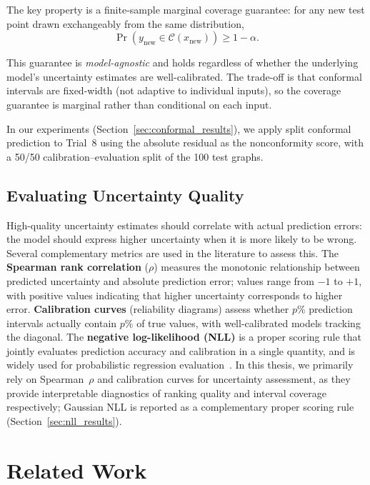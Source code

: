 The key property is a finite-sample marginal coverage guarantee: for any new test point drawn exchangeably from the same distribution,
\begin{equation}
    \Pr\!\left(y_\text{new} \in \mathcal{C}(x_\text{new})\right) \geq 1 - \alpha.
\end{equation}

This guarantee is \emph{model-agnostic} and holds regardless of whether the underlying model's uncertainty estimates are well-calibrated. The trade-off is that conformal intervals are fixed-width (not adaptive to individual inputs), so the coverage guarantee is marginal rather than conditional on each input.

In our experiments (Section~\ref{sec:conformal_results}), we apply split conformal prediction to Trial~8 using the absolute residual as the nonconformity score, with a 50/50 calibration--evaluation split of the 100 test graphs.

\subsection{Evaluating Uncertainty Quality}

High-quality uncertainty estimates should correlate with actual prediction errors: the model should express higher uncertainty when it is more likely to be wrong. Several complementary metrics are used in the literature to assess this. The \textbf{Spearman rank correlation} ($\rho$) measures the monotonic relationship between predicted uncertainty and absolute prediction error; values range from $-1$ to $+1$, with positive values indicating that higher uncertainty corresponds to higher error. \textbf{Calibration curves} (reliability diagrams) assess whether $p$\% prediction intervals actually contain $p$\% of true values, with well-calibrated models tracking the diagonal. The \textbf{negative log-likelihood (NLL)} is a proper scoring rule that jointly evaluates prediction accuracy and calibration in a single quantity, and is widely used for probabilistic regression evaluation~\cite{lakshminarayanan2017simple}. In this thesis, we primarily rely on Spearman~$\rho$ and calibration curves for uncertainty assessment, as they provide interpretable diagnostics of ranking quality and interval coverage respectively; Gaussian NLL is reported as a complementary proper scoring rule (Section~\ref{sec:nll_results}).

\section{Related Work}\label{sec:related}

